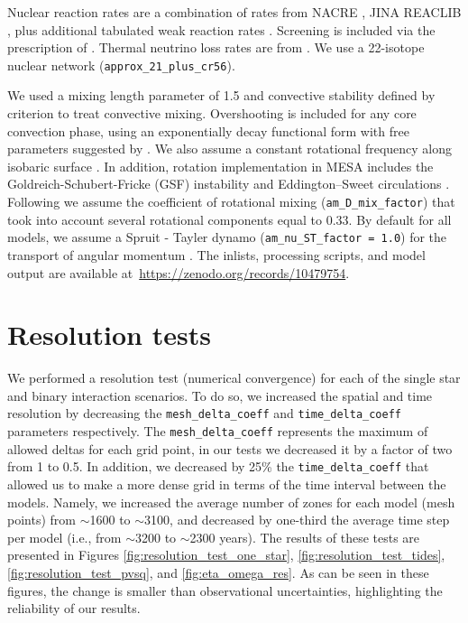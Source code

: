 \documentclass{aa}
\begin{document}
Nuclear reaction rates are a combination of rates from NACRE
\citep{Angulo1999}, JINA REACLIB \citep{Cyburt2010}, plus additional
tabulated weak reaction rates \citet{Fuller1985, Oda1994,
  Langanke2000}. Screening is included via the prescription of
\citet{Chugunov2007}.  Thermal neutrino loss rates are from
\citet{Itoh1996}. We use a
22-isotope nuclear network (\texttt{approx\_21\_plus\_cr56}).

We used a mixing length parameter of 1.5 and convective stability defined by
\citet{Ledoux_1947} criterion to treat convective mixing. Overshooting
is included for any core convection phase, using an exponentially
decay functional form \cite{Herwig_2000} with free parameters
suggested by \cite{claret:18}. We also assume a constant rotational frequency along
isobaric surface \citep{Ekstrom2012}. In addition, rotation
implementation in MESA includes the Goldreich-Schubert-Fricke (GSF)
instability \citep{Heger_2000} and Eddington–Sweet circulations
\citep{Sweet_1950}. Following \citet{Heger_2000} we assume the
coefficient of rotational mixing (\texttt{am\_D\_mix\_factor}) that
took into account several rotational components equal to 0.33.
By default for all models, we assume a Spruit - Tayler dynamo (\texttt{am\_nu\_ST\_factor = 1.0}) for the transport of angular momentum \citep{spruit:02}.
The inlists, processing scripts, and model output are available at~\url{https://zenodo.org/records/10479754}.


\section{Resolution tests}
\label{sec:resolution_test}



We performed a resolution test (numerical convergence) for each of the single star and binary interaction scenarios. To do so, we increased the spatial and time resolution by decreasing the \texttt{mesh\_delta\_coeff} and \texttt{time\_delta\_coeff} parameters respectively.
The \texttt{mesh\_delta\_coeff}  represents the maximum of allowed deltas for each grid point, in our tests we decreased it by a factor of two from 1 to 0.5. In addition, we decreased by 25\% the \texttt{time\_delta\_coeff} that allowed us to make a more dense grid in terms of the time interval between the models.
Namely, we increased the average number of zones for each model (mesh points) from $\sim$1600 to $\sim$3100, and decreased by one-third the average time step per model (i.e., from $\sim$3200 to $\sim$2300 years).
The results of these tests are presented in Figures \ref{fig:resolution_test_one_star}, \ref{fig:resolution_test_tides}, \ref{fig:resolution_test_pvsq}, and \ref{fig:eta_omega_res}. As can be seen in these figures, the change is smaller than observational uncertainties, highlighting the reliability of our results.
\end{document}

